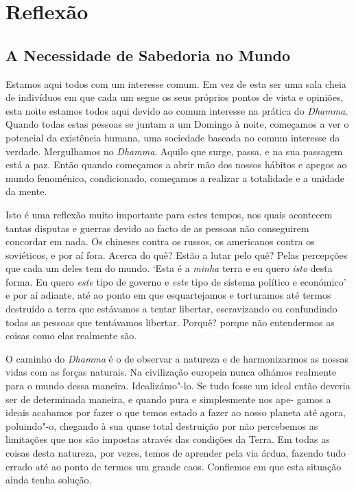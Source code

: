 \part{Reflexão}

\chapter{A Necessidade de Sabedoria no Mundo}

Estamos aqui todos com um interesse comum. Em vez de esta ser uma sala
cheia de indivíduos em que cada um segue os seus próprios pontos de
vista e opiniões, esta noite estamos todos aqui devido ao comum
interesse na prática do \emph{Dhamma}. Quando todas estas pessoas se
juntam a um Domingo à noite, começamos a ver o potencial da existência
humana, uma sociedade baseada no comum interesse da verdade. Mergulhamos
no \emph{Dhamma}. Aquilo que surge, passa, e na sua passagem está a paz.
Então quando começamos a abrir mão dos nossos hábitos e apegos ao mundo
fenoménico, condicionado, começamos a realizar a totalidade e a unidade
da mente.

Isto é uma reflexão muito importante para estes tempos, nos quais
acontecem tantas disputas e guerras devido ao facto de as pessoas não
conseguirem concordar em nada. Os chineses contra os russos, os
americanos contra os soviéticos, e por aí fora. Acerca do quê? Estão a
lutar pelo quê? Pelas percepções que cada um deles tem do mundo. `Esta é
a \emph{minha} terra e eu quero \emph{isto} desta forma. Eu quero
\emph{este} tipo de governo e \emph{este} tipo de sistema político e
económico' e por aí adiante, até ao ponto em que esquartejamos e
torturamos até termos destruído a terra que estávamos a tentar libertar,
escravizando ou confundindo todas as pessoas que tentávamos libertar.
Porquê? porque não entendermos as coisas como elas realmente são.

O caminho do \emph{Dhamma} é o de observar a natureza e de harmonizarmos
as nossas vidas com as forças naturais. Na civilização europeia nunca
olhámos realmente para o mundo dessa maneira. Idealizámo"-lo. Se tudo
fosse um ideal então deveria ser de determinada maneira, e quando pura e
simplesmente nos ape- gamos a ideais acabamos por fazer o que temos
estado a fazer ao nosso planeta até agora, poluindo"-o, chegando à sua
quase total destruição por não percebemos as limitações que nos são
impostas através das condições da Terra. Em todas as coisas desta
natureza, por vezes, temos de aprender pela via árdua, fazendo tudo
errado até ao ponto de termos um grande caos. Confiemos em que esta
situação ainda tenha solução.

